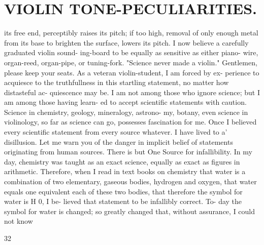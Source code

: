 \documentclass{article}
\begin{document}
\section*{VIOLIN TONE-PECULIARITIES.}
its free end, perceptibly raises its pitch; if too high, removal of only enough metal from its base to brighten the surface, lowers its pitch. I now believe a carefully graduated violin sound- ing-board to be equally as sensitive as either piano- wire, organ-reed, organ-pipe, or tuning-fork. "Science never made a violin." Gentlemen, please keep your seats. As a veteran violin-student, I am forced by ex- perience to acquiesce to the truthfullness in this startling statement, no matter how distasteful ac- quiescence may be. I am not among those who ignore science; but I am among those having learn- ed to accept scientific statements with caution. Science in chemistry, geology, mineralogy, astrono- my, botany, even science in violinology, so far as science can go, possesses fascination for me. Once I believed every scientific statement from every source whatever. I have lived to a' disillusion. Let me warn you of the danger in implicit belief of statements originating from human sources. There is but One Source for infallibility. In my day, chemistry was taught as an exact science, equally as exact as figures in arithmetic. Therefore, when I read in text books on chemistry that water is a combination of two elementary, gaseous bodies, hydrogen and oxygen, that water equals one equivalent each of these two bodies, that therefore the symbol for water is H 0, I be- lieved that statement to be infallibly correct. To- day the symbol for water is changed; so greatly changed that, without assurance, I could not know

32
\end{document}
